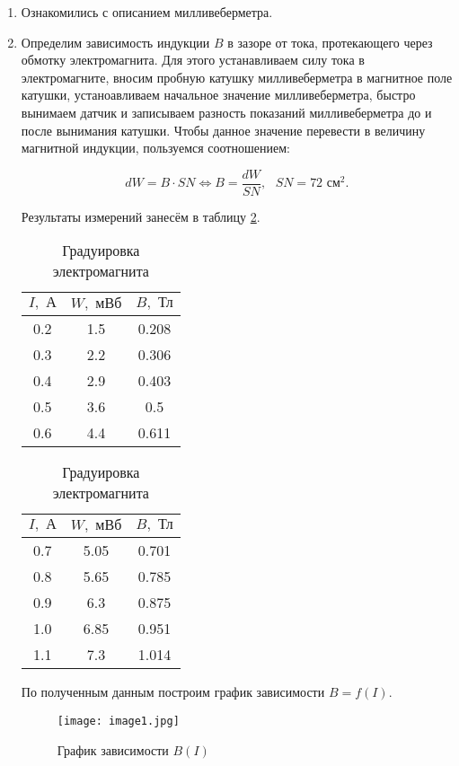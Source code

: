 \documentclass[a4paper,12pt]{article} %
\begin{document}
\begin{enumerate}
    \item Ознакомились с описанием милливеберметра.
    \item Определим зависимость индукции $B$ в зазоре от тока, протекающего через обмотку электромагнита. Для этого устанавливаем силу тока в электромагните, вносим пробную катушку милливеберметра в магнитное поле катушки, устаноавливаем начальное значение милливеберметра, быстро вынимаем датчик и записываем разность показаний милливеберметра до и после вынимания катушки. Чтобы данное значение перевести в величину магнитной индукции, пользуемся соотношением:

\[ dW = B\cdot SN \Longleftrightarrow B = \frac{dW}{SN}, \text{ } SN = 72 \text{ см}^2. \]

Результаты измерений занесём в таблицу \ref{tab1}.

\begin{table}[h]
	\centering
	\begin{tabular}{|c|c|c|}
		\hline
		$ I, \text{ А}$ & $ W, \text{ мВб}$ & $B, \text{ Тл}$ \\ \hline
		0.2 & 1.5 & 0.208 \\ \hline
            0.3 & 2.2 & 0.306 \\ \hline
            0.4 & 2.9 & 0.403 \\ \hline
            0.5 & 3.6 & 0.5 \\ \hline
            0.6 & 4.4 & 0.611 \\ \hline
	\end{tabular}
        \begin{tabular}{|c|c|c|}
		\hline
		$ I, \text{ А}$ & $ W, \text{ мВб}$ & $B, \text{ Тл}$ \\ \hline
		0.7 & 5.05 & 0.701 \\ \hline
            0.8 & 5.65 & 0.785 \\ \hline
            0.9 & 6.3 & 0.875 \\ \hline
            1.0 & 6.85 & 0.951 \\ \hline
            1.1 & 7.3 & 1.014 \\ \hline
	\end{tabular}
        
	\caption{Градуировка электромагнита}
	\label{tab1}
\end{table}

По полученным данным построим график зависимости $ B=f(I) $. 

\begin{figure}[h]
    \begin{center}
		\texttt{[image: image1.jpg]}
    \end{center}
	\caption{График зависимости $B(I)$}
\label{plot1}
\end{figure}


\end{enumerate}
\end{document}
